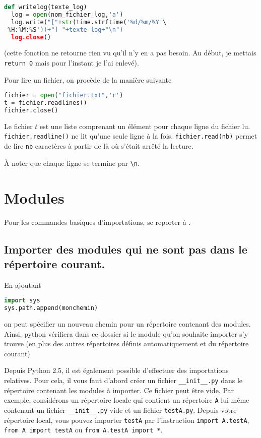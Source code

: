 \documentclass[a4paper,twoside]{article}
\begin{document}
\begin{lstlisting}[language=python]
def writelog(texte_log)
  log = open(nom_fichier_log,'a')
  log.write("["+str(time.strftime('%d/%m/%Y'\
 %H:%M:%S'))+"] "+texte_log+"\n")
  log.close()
\end{lstlisting}
(cette fonction ne retourne rien vu qu'il n'y en a pas besoin. Au début, je mettais \verb|return 0| mais pour l'instant je l'ai enlevé).

\bigskip

Pour lire un fichier, on procède de la manière suivante
\begin{lstlisting}[language=python]
fichier = open("fichier.txt",'r')
t = fichier.readlines()
fichier.close()
\end{lstlisting}

Le fichier $t$ est une liste comprenant un élément pour chaque ligne du fichier lu. \texttt{fichier.readline()} ne lit qu'une seule ligne à la fois. \texttt{fichier.read(nb)} permet de lire \texttt{nb} caractères à partir de là où s'était arrêté la lecture.

\begin{remarque}
À noter que chaque ligne se termine par \verb|\n|.
\end{remarque}

\section{Modules}
Pour les commandes basiques d'importations, se reporter à .

\subsection{Importer des modules qui ne sont pas dans le répertoire courant.}
En ajoutant
\begin{lstlisting}[language=python]
import sys
sys.path.append(monchemin)
\end{lstlisting}
on peut spécifier un nouveau chemin pour un répertoire contenant des modules. Ainsi, python vérifiera dans ce dossier si le module qu'on souhaite importer s'y trouve (en plus des autres répertoires définis automatiquement et du répertoire courant)

\bigskip

Depuis Python 2.5, il est également possible d'effectuer des importations relatives. Pour cela, il vous faut d'abord créer un fichier \verb|__init__.py| dans le répertoire contenant les modules à importer. Ce fichier peut être vide. Par exemple, considérons un répertoire locale qui contient un répertoire \texttt{A} lui même contenant un fichier \verb|__init__.py| vide et un fichier \texttt{testA.py}. Depuis votre répertoire local, vous pouvez importer \texttt{testA} par l'instruction \texttt{import A.testA}, \texttt{from A import testA} ou \texttt{from A.testA import *}.
\end{document}
